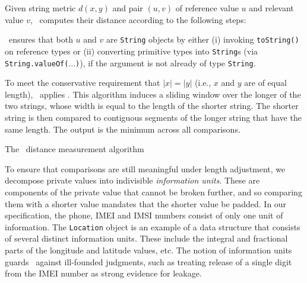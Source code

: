 Given string metric $d(x,y)$ and pair $(u,v)$ of reference value $u$ and relevant value $v$, \Tool\ computes their distance according to the following steps:
\begin{compactenum}
	\item \Tool\ ensures that both $u$ and $v$ are {\tt String} objects by either (i) invoking {\tt toString()} on reference types or (ii) converting primitive types into {\tt String}s 
	(via {\tt String.valueOf($\ldots$)}), if 
	the argument is not already of type {\tt String}.
	\item To meet the conservative requirement that $|x|=|y|$ (i.e., $x$ and $y$ are of equal length), \Tool\ applies . This algorithm induces a sliding window over the longer of the two strings, whose width is equal to the length of the shorter string. The shorter string is then compared to contiguous segments of the longer string that have the same length. The output is the minimum across all comparisons.
\end{compactenum} 


\begin{algorithm}[t]
\begin{small}
\DontPrintSemicolon
{}
\BlankLine
{}
\end{small}
\caption{\label{Al:normalized}The \Tool\ distance measurement algorithm}
\end{algorithm}

To ensure that comparisons are still meaningful under length adjustment, we decompose private values into indivisible \emph{information units}. These are components of the private value that cannot be broken further, and so comparing them with a shorter value mandates that the shorter value be padded. In our specification, the phone, IMEI and IMSI numbers consist of only one unit of information. 
%
The {\tt Location} object is an example of a data structure that consists of several distinct information units. These include the integral and fractional parts of the longitude and latitude values, etc. 
%
The notion of information units guards \Tool\ against ill-founded judgments, such as treating release of a single digit from the IMEI number as strong evidence for leakage.

